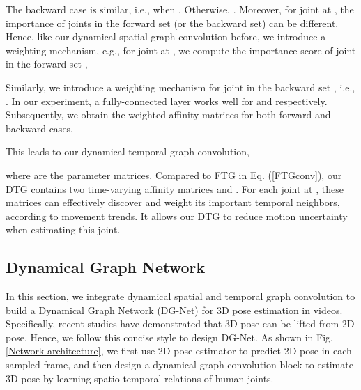 \documentclass[journal]{IEEEtran}
\begin{document}
The backward case is similar,
i.e.,
 when .
Otherwise,
.
Moreover,
for joint  at ,
the importance of joints in the forward set (or the backward set) can be different.
Hence,
like our dynamical spatial graph convolution before,
we introduce a weighting mechanism,
e.g.,
for joint  at ,
we compute the importance score of joint  in the forward set ,

Similarly,
we introduce a weighting mechanism for joint  in the backward set ,
i.e.,
.
In our experiment,
a fully-connected layer works well for  and  respectively.
Subsequently,
we obtain the weighted affinity matrices for both forward and backward cases,

This leads to our dynamical temporal graph convolution,

where
 are the parameter matrices.
Compared to FTG in Eq. (\ref{FTGconv}),
our DTG contains two time-varying affinity matrices  and .
For each joint at ,
these matrices can effectively discover and weight its important temporal neighbors,
according to movement trends.
It allows our DTG to reduce motion uncertainty when estimating this joint.
















\subsection{Dynamical Graph Network}
\label{Dynamical Graph Network}


In this section,
we integrate dynamical spatial and temporal graph convolution to build a Dynamical Graph Network (DG-Net) for 3D pose estimation in videos.
Specifically,
recent studies \cite{simple,semanticsgcn} have demonstrated that 3D pose can be lifted from 2D pose.
Hence,
we follow this concise style to design DG-Net.
As shown in Fig. \ref{Network-architecture},
we first use 2D pose estimator to predict 2D pose in each sampled frame,
and then design a dynamical graph convolution block to estimate 3D pose by learning spatio-temporal relations of human joints.
\end{document}
